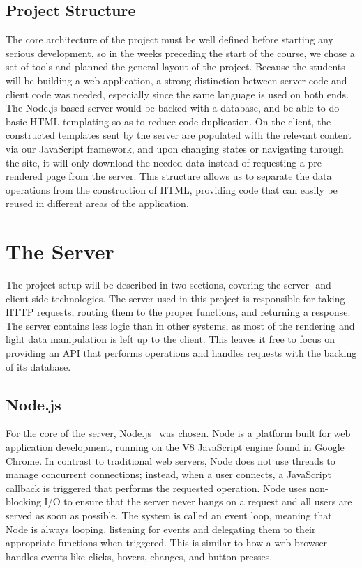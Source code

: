 \documentclass[12pt]{article}
\begin{document}
\subsection{Project Structure}\label{sec:structure}
The core architecture of the project must be well defined before starting any serious development, so in the weeks preceding the start of the course, we chose a set of tools and planned the general layout of the project. Because the students will be building a web application, a strong distinction between server code and client code was needed, especially since the same language is used on both ends. The Node.js based server would be backed with a database, and be able to do basic HTML templating so as to reduce code duplication. On the client, the constructed templates sent by the server are populated with the relevant content via our JavaScript framework, and upon changing states or navigating through the site, it will only download the needed data instead of requesting a pre-rendered page from the server. This structure allows us to separate the data operations from the construction of HTML, providing code that can easily be reused in different areas of the application.

\section{The Server}\label{sec:server}
The project setup will be described in two sections, covering the server- and client-side technologies. The server used in this project is responsible for taking HTTP requests, routing them to the proper functions, and returning a response. The server contains less logic than in other systems, as most of the rendering and light data manipulation is left up to the client. This leaves it free to focus on providing an API that performs operations and handles requests with the backing of its database.

\subsection{Node.js}\label{sec:node}
For the core of the server, Node.js~\cite{Node} was chosen. Node is a platform built for web application development, running on the V8 JavaScript engine found in Google Chrome. In contrast to traditional web servers, Node does not use threads to manage concurrent connections; instead, when a user connects, a JavaScript callback is triggered that performs the requested operation. Node uses non-blocking I/O to ensure that the server never hangs on a request and all users are served as soon as possible. The system is called an event loop, meaning that Node is always looping, listening for events and delegating them to their appropriate functions when triggered. This is similar to how a web browser handles events like clicks, hovers, changes, and button presses. 
\end{document}
